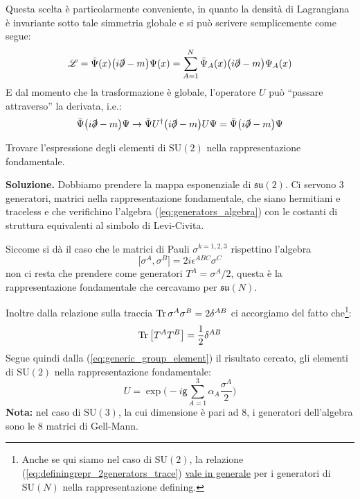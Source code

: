 \documentclass[../main.tex]{subfiles}
\begin{document}
Questa scelta è particolarmente conveniente, in quanto la densità di Lagrangiana è invariante sotto tale simmetria globale e si può scrivere semplicemente come segue:
\begin{equation}
    \mathscr{L} = \bar\Psi(x)\big(i\slashed\partial-m\big)\Psi(x) = \sum_{A=1}^N\bar\Psi_A(x)\big(i\slashed\partial-m\big)\Psi_A(x)
    \label{eq:SUN_inv_lagrangian}
\end{equation}
E dal momento che la trasformazione è globale, l'operatore $U$ può “passare attraverso” la derivata, i.e.:
\[
\bar\Psi\big(i\slashed\partial-m\big)\Psi \rightarrow\bar\Psi U^\dagger \big(i\slashed\partial-m\big)U\Psi = \bar\Psi\big(i\slashed\partial-m\big)\Psi
\]
\begin{exercise}
    Trovare l'espressione degli elementi di $\textrm{SU}(2)$ nella rappresentazione fondamentale.

    \textbf{Soluzione. } Dobbiamo prendere la mappa esponenziale di $\mathfrak{su}(2)$. Ci servono 3 generatori, matrici nella rappresentazione fondamentale, che siano hermitiani e traceless e che verifichino l'algebra (\ref{eq:generators_algebra}) con le costanti di struttura equivalenti al simbolo di Levi-Civita. 

    Siccome si dà il caso che le matrici di Pauli $\sigma^{k=1,2,3}$ rispettino l'algebra
    \[
    \big[\sigma^A, \sigma^B\big] = 2i\epsilon^{ABC}\sigma^C
    \]
    non ci resta che prendere come generatori $\boxed{T^A= \sigma^A/2}$, questa è la rappresentazione fondamentale che cercavamo per $\mathfrak{su}(N)$.

    Inoltre dalla relazione sulla traccia $\Tr\sigma^A\sigma^B=2\delta^{AB}$ ci accorgiamo del fatto che\footnote{Anche se qui siamo nel caso di $\textrm{SU}(2)$, la relazione (\ref{eq:definingrepr_2generators_trace}) \href{https://scipost.org/SciPostPhysLectNotes.21/pdf}{vale in generale} per i generatori di $\textrm{SU}(N)$ nella rappresentazione defining.}: 
    \begin{equation}
        \Tr\big[T^AT^B\big] = \frac{1}{2}\delta^{AB}
        \label{eq:definingrepr_2generators_trace}
    \end{equation}
    Segue quindi dalla (\ref{eq:generic_group_element}) il risultato cercato, gli elementi di $\textrm{SU}(2)$ nella rappresentazione fondamentale:
    \begin{equation}
        U=\exp\bigg(-i\mathsf g \sum_{A=1}^3\alpha_A\frac{\sigma^A}{2}\bigg)
        \label{eq:SU2_group_element}
    \end{equation}
    \textbf{Nota:} nel caso di $\textrm{SU}(3)$, la cui dimensione è pari ad 8, i generatori dell'algebra sono le 8 matrici di Gell-Mann.
\end{exercise}
\end{document}
